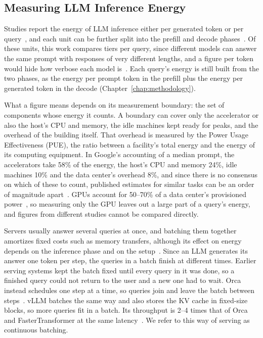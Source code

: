 \documentclass[cic,dipl,english]{infufrgs}
\begin{document}
\subsection{Measuring LLM Inference Energy}
\label{sec:metrics}
\label{sec:measurements}

Studies report the energy of LLM inference either per generated token or per
query~\cite{solovyeva2026green,elsworth2025measuring,chung2025mlenergy}, and each unit
can be further split into the prefill and decode phases~\cite{solovyeva2026green}. Of
these units, this work compares tiers per query, since different
models can answer the same prompt with responses of very different lengths, and a figure
per token would hide how verbose each model is~\cite{chung2025mlenergy}. Each query's
energy is still built from the two phases, as the energy per prompt token in the prefill
plus the energy per generated token in the decode (Chapter~\ref{chap:methodology}).

What a figure means depends on its measurement boundary: the set of components whose
energy it counts. A boundary can cover only the accelerator or also the host's CPU
and memory, the idle machines kept ready for peaks, and the overhead of the building
itself. That
overhead is measured by the Power Usage Effectiveness (PUE), the ratio between a
facility's total energy and the energy of its computing equipment. In Google's
accounting of a median prompt, the accelerators take 58\% of the energy, the host's CPU
and memory 24\%, idle machines 10\% and the data center's overhead 8\%, and since there
is no consensus on which of these to count, published estimates for similar tasks can be
an order of magnitude apart~\cite{elsworth2025measuring}. GPUs account for 50--70\% of a
data center's provisioned power~\cite{chung2025mlenergy}, so measuring only the GPU
leaves out a large part of a query's energy, and figures from different studies cannot
be compared directly.

Servers usually answer several queries at once, and batching them together amortizes
fixed costs such as memory transfers, although its effect on energy depends on the
inference phase and on the setup~\cite{delavande2026understanding}. Since an LLM
generates its answer one token per step, the queries in a batch finish at different
times. Earlier serving systems kept the batch fixed until every query in it was done, so
a finished query could not return to the user and a new one had to wait. Orca instead
schedules one step at a time, so queries join and leave the batch between
steps~\cite{yu2022orca}. vLLM batches the same way and also stores the KV cache in
fixed-size blocks, so more queries fit in a batch. Its throughput is 2--4 times that of
Orca and FasterTransformer at the same latency~\cite{kwon2023vllm}. We refer to this way
of serving as continuous batching.
\end{document}
